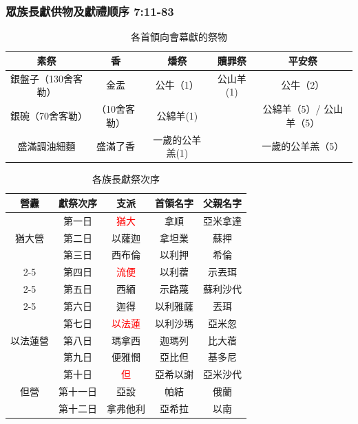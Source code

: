 \subsubsection{眾族長獻供物及獻禮顺序 7:11-83}

\begin{table}[H]
\centering
\begin{tabular}{|c|c|c|c|c|}
\hline
\hline
 素祭 & 香 & 燔祭 & 贖罪祭 & 平安祭 \\\hline
銀盤子（130舍客勒）&金盂& 公牛（1）&公山羊(1) &公牛（2） \\
銀碗（70舍客勒）     &（10舍客勒）& 公綿羊(1)         &           & 公綿羊（5）/ 公山羊（5）  \\
盛滿調油細麵         &盛滿了香   & 一歲的公羊羔(1) &          &一歲的公羊羔（5）   \\\hline
\end{tabular}
\caption{各首領向會幕獻的祭物}
\end{table}

\begin{table}[H]
\centering
\begin{tabular}{|c|c|c|c|c|}
\hline
\hline
營纛  & 獻祭次序&  支派 &首領名字 &父親名字 \\
\hline
\multirow{3}{*}{猶大營} & 第一日    & \textcolor{red}{猶大} &拿順 &亞米拿達  \\
\cline{2-5}
\multicolumn{1}{|c|}{}  & 第二日  & 以薩迦 &拿坦業  & 蘇押  \\
\cline{2-5}
\multicolumn{1}{|c|}{} & 第三日  & 西布倫&  以利押& 希倫  \\
\cline{2-5}
\hline
\multirow{3}{*}{流便營} &  第四日  &\textcolor{red}{流便}  &以利蓿 & 示丟珥 \\
\cline{2-5}
\multicolumn{1}{|c|}{}  &   第五日 &西緬  & 示路蔑 &  蘇利沙代  \\
\cline{2-5}
\multicolumn{1}{|c|}{} & 第六日  & 迦得&以利雅薩 & 丟珥  \\
\hline
\multirow{3}{*}{以法蓮營} &  第七日  &\textcolor{red}{以法蓮}  &以利沙瑪 & 亞米忽 \\
\cline{2-5}
\multicolumn{1}{|c|}{}  &   第八日 &瑪拿西  & 迦瑪列 &  比大蓿  \\
\cline{2-5}
\multicolumn{1}{|c|}{} & 第九日  & 便雅憫&亞比但 & 基多尼  \\
\hline
\multirow{3}{*}{但營} &  第十日  &\textcolor{red}{但}  &亞希以謝 & 亞米沙代 \\
\cline{2-5}
\multicolumn{1}{|c|}{}  &   第十一日 &亞設  & 帕結 &  俄蘭  \\
\cline{2-5}
\multicolumn{1}{|c|}{} & 第十二日  & 拿弗他利&亞希拉 & 以南  \\
\hline
\end{tabular}
\caption{各族長獻祭次序}
\end{table}


